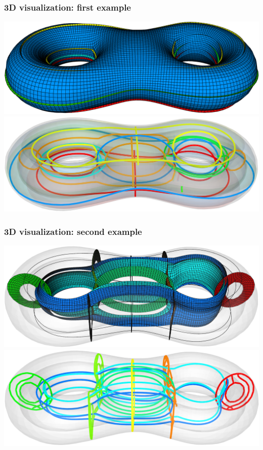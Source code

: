 \documentclass[12pt]{beamer}
\begin{document}
\begin{frame}[fragile]
  \frametitle{3D visualization: first example}
  \includegraphics[height=0.5\textheight]{./images/vis-3d-ex1-sheets.png}
  \includegraphics[height=0.5\textheight]{./images/vis-3d-ex1-curves.png}
\end{frame}

\begin{frame}[fragile]
  \frametitle{3D visualization: second example}
  \includegraphics[height=0.5\textheight]{./images/vis-3d-ex2-sheets.png}
  \includegraphics[height=0.5\textheight]{./images/vis-3d-ex2-curves.png}
\end{frame}
\end{document}
